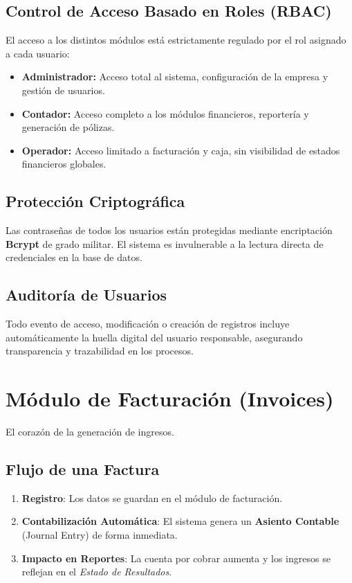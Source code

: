 \documentclass[a4paper,12pt]{article}
\begin{document}
\subsection{Control de Acceso Basado en Roles (RBAC)}
El acceso a los distintos módulos está estrictamente regulado por el rol asignado a cada usuario:
\begin{itemize}
    \item \textbf{Administrador:} Acceso total al sistema, configuración de la empresa y gestión de usuarios.
    \item \textbf{Contador:} Acceso completo a los módulos financieros, reportería y generación de pólizas.
    \item \textbf{Operador:} Acceso limitado a facturación y caja, sin visibilidad de estados financieros globales.
\end{itemize}

\subsection{Protección Criptográfica}
Las contraseñas de todos los usuarios están protegidas mediante encriptación \textbf{Bcrypt} de grado militar. El sistema es invulnerable a la lectura directa de credenciales en la base de datos.

\subsection{Auditoría de Usuarios}
Todo evento de acceso, modificación o creación de registros incluye automáticamente la huella digital del usuario responsable, asegurando transparencia y trazabilidad en los procesos.

\section{Módulo de Facturación (Invoices)}
El corazón de la generación de ingresos. 
\subsection{Flujo de una Factura}
\begin{enumerate}[label=\arabic*.]
    \item \textbf{Registro}: Los datos se guardan en el módulo de facturación.
    \item \textbf{Contabilización Automática}: El sistema genera un \textbf{Asiento Contable} (Journal Entry) de forma inmediata.
    \item \textbf{Impacto en Reportes}: La cuenta por cobrar aumenta y los ingresos se reflejan en el \textit{Estado de Resultados}.
\end{enumerate}
\end{document}
